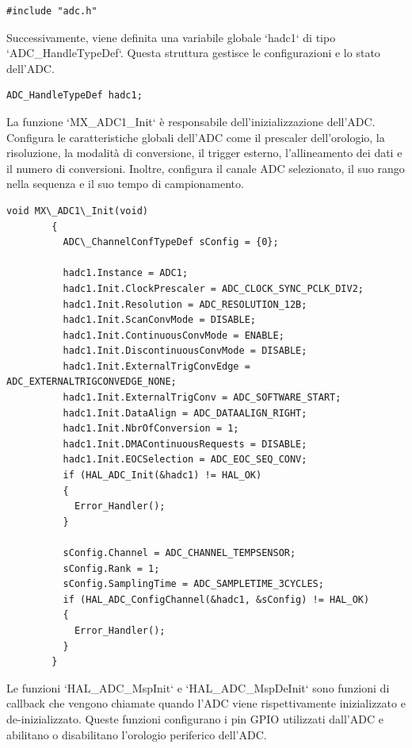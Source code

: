 \documentclass{article}
\begin{document}
        \begin{lstlisting}[style=CStyle]
        #include "adc.h"
        \end{lstlisting}
        
        Successivamente, viene definita una variabile globale `hadc1` di tipo `ADC\_HandleTypeDef`. Questa struttura gestisce le configurazioni e lo stato dell'ADC.
        
        \begin{lstlisting}[style=CStyle]
        ADC_HandleTypeDef hadc1;
        \end{lstlisting}
        
        La funzione `MX\_ADC1\_Init` è responsabile dell'inizializzazione dell'ADC. Configura le caratteristiche globali dell'ADC come il prescaler dell'orologio, la risoluzione, la modalità di conversione, il trigger esterno, l'allineamento dei dati e il numero di conversioni. Inoltre, configura il canale ADC selezionato, il suo rango nella sequenza e il suo tempo di campionamento.
        
        \begin{lstlisting}[style=CStyle]
        void MX\_ADC1\_Init(void)
        {
          ADC\_ChannelConfTypeDef sConfig = {0};
        
          hadc1.Instance = ADC1;
          hadc1.Init.ClockPrescaler = ADC_CLOCK_SYNC_PCLK_DIV2;
          hadc1.Init.Resolution = ADC_RESOLUTION_12B;
          hadc1.Init.ScanConvMode = DISABLE;
          hadc1.Init.ContinuousConvMode = ENABLE;
          hadc1.Init.DiscontinuousConvMode = DISABLE;
          hadc1.Init.ExternalTrigConvEdge = ADC_EXTERNALTRIGCONVEDGE_NONE;
          hadc1.Init.ExternalTrigConv = ADC_SOFTWARE_START;
          hadc1.Init.DataAlign = ADC_DATAALIGN_RIGHT;
          hadc1.Init.NbrOfConversion = 1;
          hadc1.Init.DMAContinuousRequests = DISABLE;
          hadc1.Init.EOCSelection = ADC_EOC_SEQ_CONV;
          if (HAL_ADC_Init(&hadc1) != HAL_OK)
          {
            Error_Handler();
          }
        
          sConfig.Channel = ADC_CHANNEL_TEMPSENSOR;
          sConfig.Rank = 1;
          sConfig.SamplingTime = ADC_SAMPLETIME_3CYCLES;
          if (HAL_ADC_ConfigChannel(&hadc1, &sConfig) != HAL_OK)
          {
            Error_Handler();
          }
        }
        \end{lstlisting}
        
        Le funzioni `HAL\_ADC\_MspInit` e `HAL\_ADC\_MspDeInit` sono funzioni di callback che vengono chiamate quando l'ADC viene rispettivamente inizializzato e de-inizializzato. Queste funzioni configurano i pin GPIO utilizzati dall'ADC e abilitano o disabilitano l'orologio periferico dell'ADC.
        
\end{document}
